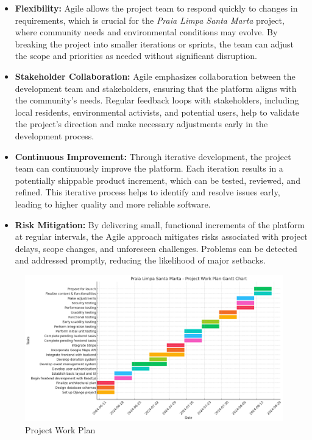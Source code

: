 \begin{itemize}
    \item \textbf{Flexibility:} Agile allows the project team to respond quickly to changes in requirements, which is crucial for the \textit{Praia Limpa Santa Marta} project, where community needs and environmental conditions may evolve. By breaking the project into smaller iterations or sprints, the team can adjust the scope and priorities as needed without significant disruption.

    \item \textbf{Stakeholder Collaboration:} Agile emphasizes collaboration between the development team and stakeholders, ensuring that the platform aligns with the community’s needs. Regular feedback loops with stakeholders, including local residents, environmental activists, and potential users, help to validate the project's direction and make necessary adjustments early in the development process.

    \item \textbf{Continuous Improvement:} Through iterative development, the project team can continuously improve the platform. Each iteration results in a potentially shippable product increment, which can be tested, reviewed, and refined. This iterative process helps to identify and resolve issues early, leading to higher quality and more reliable software.

    \item \textbf{Risk Mitigation:} By delivering small, functional increments of the platform at regular intervals, the Agile approach mitigates risks associated with project delays, scope changes, and unforeseen challenges. Problems can be detected and addressed promptly, reducing the likelihood of major setbacks.

\end{itemize}
\begin{figure}[h!]
    \centering
    \includegraphics[width=1\textwidth]{images/gantt_chart.png}
    \caption{Project Work Plan}
    \label{fig:work_plan}
\end{figure}

